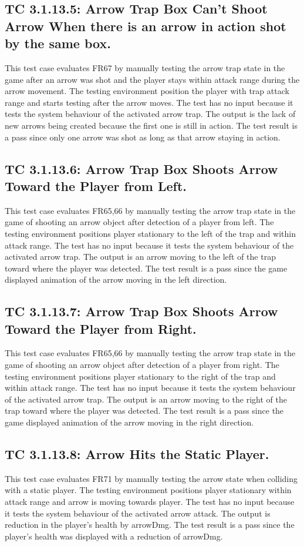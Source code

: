 \documentclass[12pt, titlepage]{article}
\begin{document}
\subsection*{TC 3.1.13.5: Arrow Trap Box Can’t Shoot Arrow When there is an arrow in action shot by the same box.}
This test case evaluates FR67 by manually testing the arrow trap state in the game after an arrow was shot and the player stays within attack range during the arrow movement. The testing environment position the player with trap attack range and starts testing after the arrow moves. The test has no input because it tests the system behaviour of the activated arrow trap. The output is the lack of new arrows being created because the first one is still in action. The test result is a pass since only one arrow was shot as long as that arrow staying in action. 

\subsection*{TC 3.1.13.6: Arrow Trap Box Shoots Arrow Toward the Player from Left.}
This test case evaluates FR65,66 by manually testing the arrow trap state in the game of shooting an arrow object after detection of a player from left. The testing environment positions player stationary to the left of the trap and within attack range. The test has no input because it tests the system behaviour of the activated arrow trap. The output is an arrow moving to the left of the trap toward where the player was detected. The test result is a pass since the game displayed animation of the arrow moving in the left direction. 

\subsection*{TC 3.1.13.7: Arrow Trap Box Shoots Arrow Toward the Player from Right.}
This test case evaluates FR65,66 by manually testing the arrow trap state in the game of shooting an arrow object after detection of a player from right. The testing environment positions player stationary to the right of the trap and within attack range. The test has no input because it tests the system behaviour of the activated arrow trap. The output is an arrow moving to the right of the trap toward where the player was detected. The test result is a pass since the game displayed animation of the arrow moving in the right direction.

\subsection*{TC 3.1.13.8: Arrow Hits the Static Player.}
This test case evaluates FR71 by manually testing the arrow state when colliding with a static player. The testing environment positions player stationary within attack range and arrow is moving towards player. The test has no input because it tests the system behaviour of the activated arrow attack. The output is reduction in the player's health by arrowDmg. The test result is a pass since the player's health was displayed with a reduction of arrowDmg. 
\end{document}
